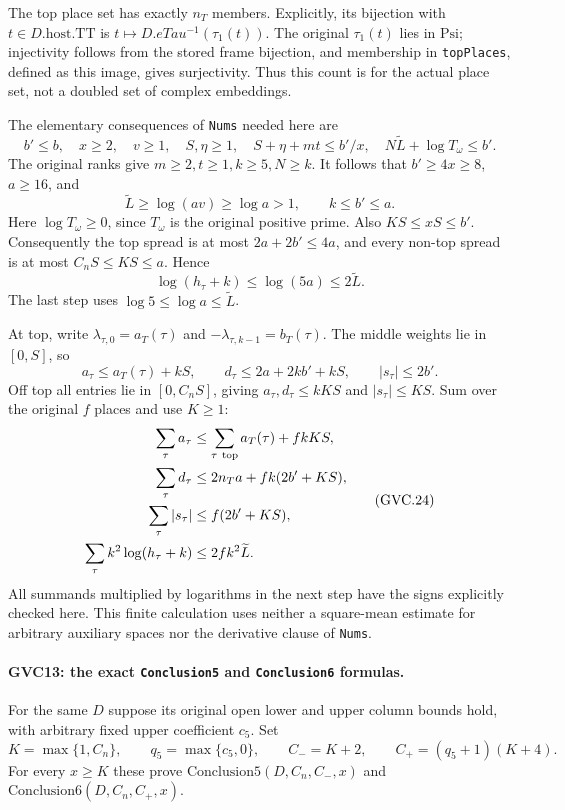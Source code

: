 The top place set has exactly $n_T$ members.
Explicitly, its bijection with $t\in D.\mathrm{host}.\mathrm{TT}$
is
$t\mapsto D.eTau^{-1}(\tau_1(t))$.
The original $\tau_1(t)$ lies in $\mathrm{Psi}$; injectivity
follows from the stored frame bijection, and membership in
\texttt{topPlaces}, defined as this image, gives surjectivity.
Thus this count is for the actual place set, not a doubled set
of complex embeddings.

The elementary consequences of \texttt{Nums} needed here are
\[
 b'\le b,\quad x\ge2,\quad v\ge1,\quad
 S,\eta\ge1,\quad S+\eta+mt\le b'/x,\quad
 N\widetilde L+\log T_\omega\le b'.                          \tag{GVC.22}
\]
The original ranks give $m\ge2,t\ge1,k\ge5,N\ge k$.
It follows that $b'\ge4x\ge8$, $a\ge16$, and
\[
 \widetilde L\ge\log(av)\ge\log a>1,\qquad
                  k\le b'\le a.
\]
Here $\log T_\omega\ge0$, since $T_\omega$ is the original
positive prime. Also $KS\le xS\le b'$.
Consequently the top spread is at most
$2a+2b'\le4a$, and every non-top spread is at most
$C_nS\le KS\le a$. Hence
\[
              \log(h_\tau+k)\le\log(5a)
                            \le2\widetilde L.              \tag{GVC.23}
\]
The last step uses $\log5\le\log a\le\widetilde L$.

At top, write $\lambda_{\tau,0}=a_T(\tau)$ and
$-\lambda_{\tau,k-1}=b_T(\tau)$.
The middle weights lie in $[0,S]$, so
\[
 a_\tau\le a_T(\tau)+kS,\qquad
 d_\tau\le2a+2kb'+kS,\qquad |s_\tau|\le2b'.
\]
Off top all entries lie in $[0,C_nS]$, giving
$a_\tau,d_\tau\le kKS$ and $|s_\tau|\le KS$.
Sum over the original $f$ places and use $K\ge1$:
\[
 \begin{split}
 \sum_\tau a_\tau
    &\le\sum_{\tau\ {\rm top}}a_T(\tau)+fkKS,\\
 \sum_\tau d_\tau
    &\le2n_Ta+fk(2b'+KS),\\
 \sum_\tau|s_\tau|&\le f(2b'+KS),\\
 \sum_\tau k^2\log(h_\tau+k)&\le2fk^2\widetilde L .
 \end{split}                                                 \tag{GVC.24}
\]
All summands multiplied by logarithms in the next step have
the signs explicitly checked here. This finite calculation
uses neither a square-mean estimate for arbitrary auxiliary
spaces nor the derivative clause of \texttt{Nums}.

\paragraph{GVC13: the exact \texttt{Conclusion5} and \texttt{Conclusion6} formulas.}
\label{claim:GVC13}
For the same $D$ suppose its original open lower and upper
column bounds hold, with arbitrary fixed upper coefficient $c_5$.
Set
\[
 K=\max\{1,C_n\},\qquad q_5=\max\{c_5,0\},\qquad
 C_-=K+2,\qquad C_+=(q_5+1)(K+4).                            \tag{GVC.25}
\]
For every $x\ge K$ these prove
$\mathrm{Conclusion5}(D,C_n,C_-,x)$ and
$\mathrm{Conclusion6}(D,C_n,C_+,x)$.

